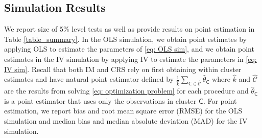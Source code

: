 \documentclass[preprint]{imsart}
\numberwithin{equation}{section}
\theoremstyle{plain}
\theoremstyle{definition}
\renewcommand{\(}{\left(}
\renewcommand{\)}{\right)}
\renewcommand{\[}{\left[}
\renewcommand{\]}{\right]}
\renewcommand{\hat}{\widehat}
\newcommand{\G}{k}
\renewcommand{\hat}{\widehat}
\begin{document}

\subsection{Simulation Results}
\label{subsec: sim results}

We report size of 5\% level tests as well as provide results on point estimation in Table \ref{table_summary}. In the OLS simulation, we obtain point estimates by applying OLS to estimate the parameters of \eqref{eq: OLS sim}, and we obtain point estimates in the IV simulation by applying IV to estimate the parameters in \eqref{eq: IV sim}. Recall that both IM and CRS rely on first obtaining within cluster estimates and have natural point estimator defined by $\frac{1}{\hat \G} \sum_{\mathsf C \in \hat {\mathcal C}} \hat \theta_{\mathsf C}$ where $\hat\G$ and $\hat{\mathcal{C}}$ are the results from solving \eqref{eq: optimization problem} for each procedure and $\hat \theta_{\mathsf C}$ is a point estimator that uses only the observations in cluster $\mathsf C$. For point estimation, we report bias and root mean square error (RMSE) for the OLS simulation and median bias and median absolute deviation (MAD) for the IV simulation. 


\end{document}
